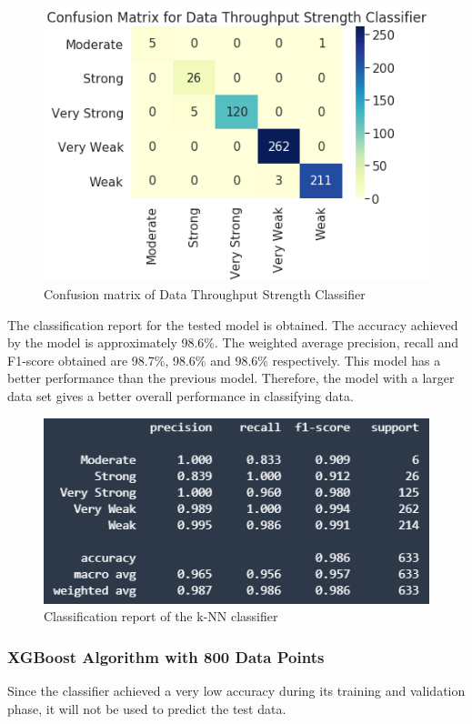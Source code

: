\begin{figure} [ht]
    \centering
    \includegraphics[scale=1.0]{pages/Chapter5/Chapter 5 images/knn_6k.PNG}
    \caption{Confusion matrix of Data Throughput Strength Classifier}
    \label{fig_cm1}
\end{figure}

The classification report for the tested model is obtained. The accuracy achieved by the model is approximately 98.6\%. The weighted average precision, recall and F1-score obtained are 98.7\%, 98.6\% and 98.6\% respectively. This model has a better performance than the previous model. Therefore, the model with a larger data set gives a better overall performance in classifying data.


\begin{figure} [ht]
    \centering
    \includegraphics[scale=1.3]{pages/Chapter5/Chapter 5 images/C_report_knn6k.PNG}
    \caption{Classification report of the k-NN classifier}
    \label{fig_crknn}
\end{figure}

\subsubsection{XGBoost Algorithm with 800 Data Points}
Since the classifier achieved a very low accuracy during its training and validation phase, it will not be used to predict the test data.

